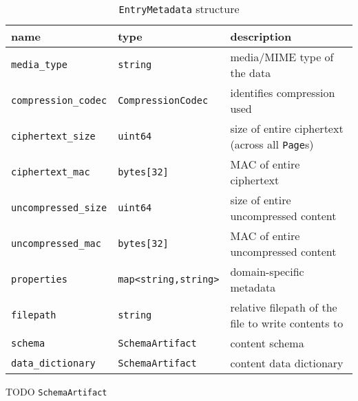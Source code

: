 \documentclass[10pt]{article}
\newcommand{\ttt}[1]{\texttt{#1}}
\def\Page{\ttt{Page}}
\begin{document}
\begin{appendices}
\begin{table}[p]
	\caption*{\ttt{EntryMetadata} structure}
	\begin{small}
	\begin{tabular}{lll}
		\toprule
		name & type  & description \\ \midrule
		\ttt{media\_type} & \ttt{string} & media/MIME type of the data \\
		\ttt{compression\_codec} & \ttt{CompressionCodec} & identifies compression used \\
		\ttt{ciphertext\_size} & \ttt{uint64} & size of entire ciphertext (across all \Page{}s) \\
		\ttt{ciphertext\_mac} & \ttt{bytes[32]} & MAC of entire ciphertext \\
		\ttt{uncompressed\_size} & \ttt{uint64} & size of entire uncompressed content \\
		\ttt{uncompressed\_mac} & \ttt{bytes[32]} & MAC of entire uncompressed content \\
		\ttt{properties} & \ttt{map<string,string>} & domain-specific metadata \\
		\ttt{filepath} & \ttt{string} & relative filepath of the file to write contents to \\
		\ttt{schema} & \ttt{SchemaArtifact} & content schema \\
		\ttt{data\_dictionary} & \ttt{SchemaArtifact} & content data dictionary \\
		\bottomrule
	\end{tabular}
	\end{small}
\end{table}

TODO \ttt{SchemaArtifact}

\end{appendices}

\printbibliography
\end{document}
